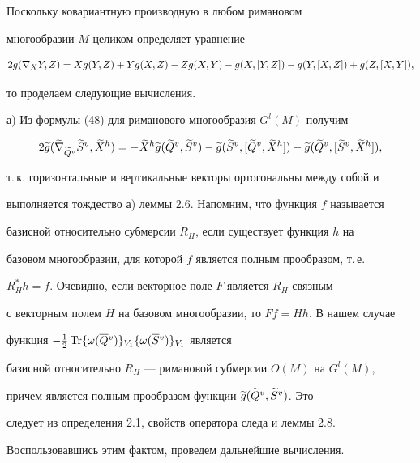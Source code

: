 \begin{pf} Поскольку ковариантную производную в любом римановом


многообразии $M$ целиком определяет уравнение


\begin{equation}




2g(\n{X}{Y},Z)=Xg(Y,Z)+Yg(X,Z)-Zg(X,Y)-


g(X,[Y,Z])-g(Y,[X,Z])+g(Z,[X,Y]),


\end{equation}


то проделаем следующие вычисления.





а) Из формулы (48) для риманового многообразия $G^l(M)$ получим


\begin{equation}




2\g{g}(\grn{\tvQ}{\grv{S}},\grh{X})=-\grh{X}\g{g}(\grv{Q},\grv{S})-\g{g}(


\grv{S},[\grv{Q},\grh{X}])-\g{g}(\grv{Q},[\grv{S},\grh{X}]),


\end{equation}


т.\,к. горизонтальные и вертикальные векторы ортогональны между собой и


выполняется тождество а) леммы 2.6. Напомним, что функция $f$ называется


базисной относительно субмерсии $R_H$, если существует функция $h$ на


базовом многообразии, для которой $f$ является полным прообразом, т.\,е.


$R_H^*h=f$. Очевидно, если векторное поле $F$ является $R_H$-связным


с векторным полем $H$ на базовом многообразии, то $Ff=Hh$. В нашем случае


функция $-\frac12\operatorname{Tr}\{\omega(\overline {Q}{}^v)\}_{V_1}\{\omega(\overline {S}{}^v)\}_{V_1}$ является


базисной относительно $R_H$ --- римановой субмерсии $O(M)$ на $G^l(M)$,


причем является полным прообразом функции $\widetilde {g}(\widetilde {Q}{}^v,\widetilde {S}{}^v)$. Это


следует из определения 2.1, свойств оператора следа и леммы 2.8.


Воспользовавшись этим фактом, проведем дальнейшие вычисления.


\begin{multline*}



\end{multline*}
\end{pf}
